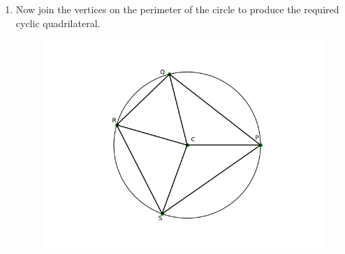 \documentclass[journal,12pt,twocolumn]{IEEEtran}
\begin{document}
\begin{enumerate}
\begin{figure}[ht]
\end{figure}
\item Now join the vertices on the perimeter of the circle to produce the required cyclic quadrilateral.
\begin{figure}[ht]
    \centering
    \includegraphics[scale = 0.5]{figs/cnstrct_fig3.png}
\end{figure}

\end{enumerate}
\end{document}
